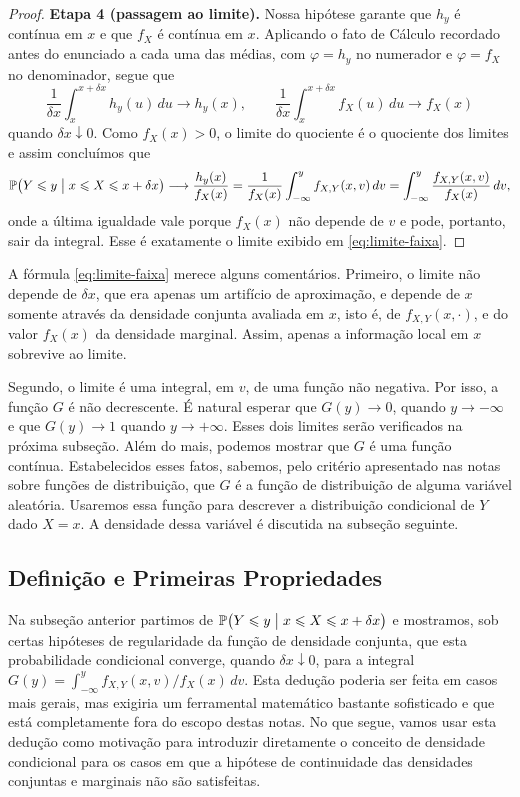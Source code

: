 \documentclass[12pt,portuguese]{article}
\theoremstyle{definition}
\theoremstyle{plainexercise}
\theoremstyle{starredexercise}
\theoremstyle{definition}
\begin{document}
\begin{proof}
\smallskip
\noindent\textbf{Etapa 4 (passagem ao limite).}
Nossa hipótese garante que $h_y$ é contínua em $x$ e que $f_X$ é contínua em $x$.
Aplicando o fato de Cálculo recordado antes do enunciado a cada uma das médias, com
$\varphi = h_y$ no numerador e $\varphi = f_X$ no denominador, segue que
\[
  \frac{1}{\delta x}\int_x^{x+\delta x} h_y(u)\,du \longrightarrow h_y(x),
  \qquad
  \frac{1}{\delta x}\int_x^{x+\delta x} f_X(u)\,du \longrightarrow f_X(x)
\]
quando $\delta x \downarrow 0$. Como $f_X(x) > 0$, o limite do quociente é o quociente dos
limites e assim concluímos que 
\[
  \mathbb{P}\bigl(Y \leqslant y \bigm| x \leqslant X \leqslant x+\delta x\bigr)
  \longrightarrow \frac{h_y(x)}{f_X(x)}
  = \frac{1}{f_X(x)}\int_{-\infty}^{y} f_{X,Y}(x,v)\,dv
  = \int_{-\infty}^{y} \frac{f_{X,Y}(x,v)}{f_X(x)}\,dv,
\]
onde a última igualdade vale porque $f_X(x)$ não depende de $v$ e pode, portanto, sair da
integral. Esse é exatamente o limite exibido em \eqref{eq:limite-faixa}.
\end{proof}

A fórmula \eqref{eq:limite-faixa} merece alguns comentários. Primeiro, o limite não depende
de $\delta x$, que era apenas um artifício de aproximação, e depende de $x$ somente
através da densidade conjunta avaliada em $x$, isto é, de $f_{X,Y}(x,\cdot)$, e do valor
$f_X(x)$ da densidade marginal. Assim, apenas a informação local em $x$ sobrevive ao
limite.

Segundo, o limite é uma integral, em $v$, de uma função não negativa. Por isso, a função
$G$ é não decrescente. É natural esperar que $G(y)\to 0$, quando $y\to-\infty$ e que
$G(y)\to 1$ quando $y\to+\infty$. Esses dois limites serão verificados na próxima
subseção. Além do mais, podemos mostrar que $G$ é uma função contínua.
Estabelecidos esses fatos, sabemos, pelo critério apresentado nas notas sobre
funções de distribuição, que $G$ é a função de distribuição de alguma variável aleatória.
Usaremos essa função para descrever a distribuição condicional de $Y$ dado $X=x$.
A densidade dessa variável é discutida na subseção seguinte.

\subsection{Definição e Primeiras Propriedades}\label{subsec:definicao-propriedades}

Na subseção anterior partimos de
$\mathbb{P}\bigl(Y \leqslant y \bigm| x \leqslant X \leqslant x + \delta x\bigr)$ e
mostramos, sob certas hipóteses de regularidade da função de densidade conjunta, 
que esta probabilidade condicional converge, quando $\delta x \downarrow 0$, para a integral
$G(y) = \int_{-\infty}^{y} f_{X,Y}(x,v)/f_X(x)\,dv$.
Esta dedução poderia ser feita em casos mais gerais, mas exigiria um ferramental matemático 
bastante sofisticado e que está completamente fora do escopo destas notas.
No que segue, vamos usar esta dedução como motivação para introduzir diretamente o conceito 
de densidade condicional para os casos em que a hipótese de continuidade
das densidades conjuntas e marginais não são satisfeitas. 
\end{document}
